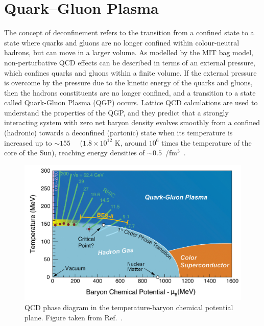 \section{Quark--Gluon Plasma}
The concept of deconfinement refers to the transition from a confined state to a state where quarks and gluons are no longer confined within colour-neutral hadrons, but can move in a larger volume. As modelled by the MIT bag model, non-perturbative QCD effects can be described in terms of an external pressure, which confines quarks and gluons within a finite volume. If the external pressure is overcome by the pressure due to the kinetic energy of the quarks and gluons, then the hadrons constituents are no longer confined, and a transition to a state called Quark-Gluon Plasma (QGP) occurs. Lattice QCD calculations are used to understand the properties of the QGP, and they predict that a strongly interacting system with zero net baryon density evolves smoothly from a confined (hadronic) towards a deconfined (partonic) state when its temperature is increased up to $\sim155$~\mev~\cite{HotQCD:2014kol, Borsanyi:2013bia} ($1.8\times 10^{12}$ K, around $10^6$ times the temperature of the core of the Sun), reaching energy densities of $\sim 0.5$~\gev/fm$^3$~\cite{Bazavov:2017dus}.

\begin{figure}
  \centering
  \includegraphics[width=0.7\linewidth]{Figures/Chapter 1/QCD-diagram.jpg}
  \caption{QCD phase diagram in the temperature-baryon chemical potential plane. Figure taken from Ref.~\cite{QCD_diagram}.}
  \label{fig:PhaseDiagram}
\end{figure}

